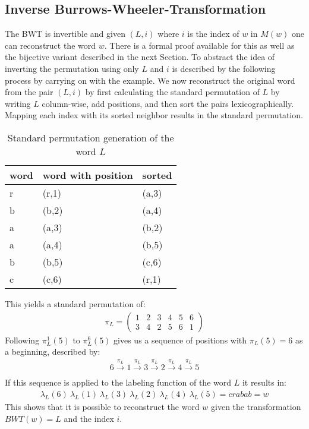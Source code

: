 \subsection{Inverse Burrows-Wheeler-Transformation}
\label{ch:Principles of compression:sec:Other:subSec:bwtInverse}
\par{
 The BWT is invertible and given $(L, i)$ where $i$ is the index of $w$ in $M(w)$ one can reconstruct the word $w$. There is a formal proof \cite{kufleitner2009bijective} available for this as well as the bijective variant described in the next Section. To abstract the idea of inverting the permutation using only $L$ and $i$ is described by the following process by carrying on with the example. We now reconstruct the original word from the pair $(L,i)$ by first calculating the standard permutation of $L$ by writing $L$ column-wise, add positions, and then sort the pairs lexicographically. Mapping each index with its sorted neighbor results in the standard permutation.  
 \begin{table}[h]
 	\centering
 	\begin{tabular}{l|l|l}
		word & word with position & sorted\\
		\hline
		r & (r,1) & (a,3) \\
		b & (b,2) & (a,4) \\
		a & (a,3) & (b,2) \\
		a & (a,4) & (b,5) \\
		b & (b,5) & (c,6) \\
		c & (c,6) & (r,1)
 		\label{tab:t11 standard permutation}
 	\end{tabular}
 	\caption{Standard permutation generation of the word $L$}
 \end{table}
}
\par{
This yields a standard permutation of:
\begin{gather}  
\pi_L = 
\begin{pmatrix} 1 & 2 & 3 & 4 & 5 & 6\\ 3 & 4 & 2 & 5 & 6 & 1 \end{pmatrix}
\end{gather}
Following $\pi^1_L(5)$ to $\pi^6_L(5)$ gives us a sequence of positions with $\pi_L(5)=6$ as a beginning, described by:
\begin{gather} 
6 \xrightarrow[]{\pi_L} 1 \xrightarrow[]{\pi_L} 3 \xrightarrow[]{\pi_L} 2 \xrightarrow[]{\pi_L} 4 \xrightarrow[]{\pi_L} 5
\end{gather}
If this sequence is applied to the labeling function of the word $L$ it results in: 
\begin{gather}  
\lambda_L(6) \: \lambda_L(1) \: \lambda_L(3) \: \lambda_L(2) \: \lambda_L(4) \: \lambda_L(5)
= crabab = w
\end{gather}
This shows that it is possible to reconstruct the word $w$ given the transformation $BWT(w)=L$ and the index $i$.
}

